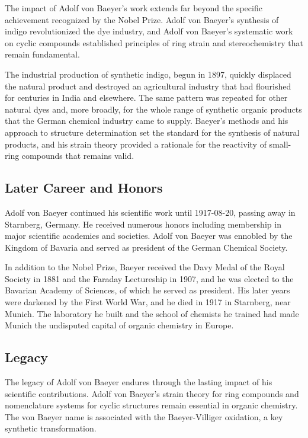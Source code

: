 The impact of Adolf von Baeyer's work extends far beyond the specific achievement recognized by the Nobel Prize.
Adolf von Baeyer's synthesis of indigo revolutionized the dye industry, and Adolf von Baeyer's systematic work on cyclic compounds established principles of ring strain and stereochemistry that remain fundamental.

The industrial production of synthetic indigo, begun in 1897, quickly displaced the natural product and destroyed an agricultural industry that had flourished for centuries in India and elsewhere. The same pattern was repeated for other natural dyes and, more broadly, for the whole range of synthetic organic products that the German chemical industry came to supply. Baeyer's methods and his approach to structure determination set the standard for the synthesis of natural products, and his strain theory provided a rationale for the reactivity of small-ring compounds that remains valid.

\subsection*{Later Career and Honors}

Adolf von Baeyer continued his scientific work until 1917-08-20, passing away in Starnberg, Germany.
He received numerous honors including membership in major scientific academies and societies.
Adolf von Baeyer was ennobled by the Kingdom of Bavaria and served as president of the German Chemical Society.

In addition to the Nobel Prize, Baeyer received the Davy Medal of the Royal Society in 1881 and the Faraday Lectureship in 1907, and he was elected to the Bavarian Academy of Sciences, of which he served as president. His later years were darkened by the First World War, and he died in 1917 in Starnberg, near Munich. The laboratory he built and the school of chemists he trained had made Munich the undisputed capital of organic chemistry in Europe.

\subsection*{Legacy}

The legacy of Adolf von Baeyer endures through the lasting impact of his scientific contributions.
Adolf von Baeyer's strain theory for ring compounds and nomenclature systems for cyclic structures remain essential in organic chemistry. The von Baeyer name is associated with the Baeyer-Villiger oxidation, a key synthetic transformation.

